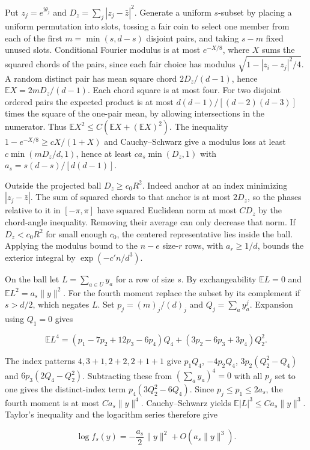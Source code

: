 Put $z_j=e^{\mathrm{i}\theta_j}$ and $D_z=\sum_j|z_j-\bar z|^2$. Generate a uniform $s$-subset by placing a uniform permutation into slots, tossing a fair coin to select one member from each of the first $m=\min(s,d-s)$ disjoint pairs, and taking $s-m$ fixed unused slots. Conditional Fourier modulus is at most $e^{-X/8}$, where $X$ sums the squared chords of the pairs, since each fair choice has modulus $\sqrt{1-|z_i-z_j|^2/4}$. A random distinct pair has mean square chord $2D_z/(d-1)$, hence $\mathbb E X=2mD_z/(d-1)$. Each chord square is at most four. For two disjoint ordered pairs the expected product is at most $d(d-1)/[(d-2)(d-3)]$ times the square of the one-pair mean, by allowing intersections in the numerator. Thus $\mathbb E X^2\le C(\mathbb E X+(\mathbb E X)^2)$. The inequality $1-e^{-X/8}\ge cX/(1+X)$ and Cauchy--Schwarz give a modulus loss at least $c\min(mD_z/d,1)$, hence at least $ca_s\min(D_z,1)$ with $a_s=s(d-s)/[d(d-1)]$.

Outside the projected ball $D_z\ge c_0R^2$. Indeed anchor at an index minimizing $|z_j-\bar z|$. The sum of squared chords to that anchor is at most $2D_z$, so the phases relative to it in $[-\pi,\pi]$ have squared Euclidean norm at most $C D_z$ by the chord-angle inequality. Removing their average can only decrease that norm. If $D_z<c_0R^2$ for small enough $c_0$, the centered representative lies inside the ball. Applying the modulus bound to the $n-e$ size-$r$ rows, with $a_r\ge1/d$, bounds the exterior integral by $\exp(-c'n/d^3)$.

On the ball let $L=\sum_{a\in U}y_a$ for a row of size $s$. By exchangeability $\mathbb E L=0$ and $\mathbb E L^2=a_s\|y\|^2$. For the fourth moment replace the subset by its complement if $s>d/2$, which negates $L$. Set $p_j=(m)_j/(d)_j$ and $Q_j=\sum_a y_a^j$. Expansion using $Q_1=0$ gives

\begin{equation*}
\mathbb E L^4=(p_1-7p_2+12p_3-6p_4)Q_4+(3p_2-6p_3+3p_4)Q_2^2.
\end{equation*}

The index patterns $4,3+1,2+2,2+1+1$ give $p_1Q_4$, $-4p_2Q_4$, $3p_2(Q_2^2-Q_4)$ and $6p_3(2Q_4-Q_2^2)$. Subtracting these from $(\sum_a y_a)^4=0$ with all $p_j$ set to one gives the distinct-index term $p_4(3Q_2^2-6Q_4)$. Since $p_j\le p_1\le2a_s$, the fourth moment is at most $Ca_s\|y\|^4$. Cauchy--Schwarz yields $\mathbb E|L|^3\le Ca_s\|y\|^3$. Taylor's inequality and the logarithm series therefore give

\begin{equation*}
\log f_s(y)=-\frac{a_s}{2}\|y\|^2+O(a_s\|y\|^3).
\end{equation*}

